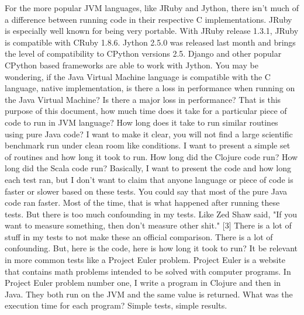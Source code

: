   For the more popular JVM languages, like JRuby and Jython, there isn't much of
  a difference between running code in their respective C implementations. JRuby
  is especially well known for being very portable. With JRuby release 1.3.1,
  JRuby is compatible with CRuby 1.8.6. Jython 2.5.0 was released last month and
  brings the level of compatibility to CPython versions 2.5. Django and other
  popular CPython based frameworks are able to work with Jython. You may be
  wondering, if the Java Virtual Machine language is compatible with the C
  language, native implementation, is there a loss in performance when running
  on the Java Virtual Machine? Is there a major loss in performance? That is
  this purpose of this document, how much time does it take for a particular
  piece of code to run in JVM language? How long does it take to run similar
  routines using pure Java code? I want to make it clear, you will not find a
  large scientific benchmark run under clean room like conditions. I want to
  present a simple set of routines and how long it took to run. How long did the
  Clojure code run? How long did the Scala code run? Basically, I want to
  present the code and how long each test ran, but I don't want to claim that
  anyone language or piece of code is faster or slower based on these tests. You
  could say that most of the pure Java code ran faster. Most of the time, that
  is what happened after running these tests. But there is too much confounding
  in my tests. Like Zed Shaw said, "If you want to measure something, then don't
  measure other shit." [3] There is a lot of stuff in my tests to not make these
  an official comparison. There is a lot of confounding. But, here is the code,
  here is how long it took to run? It be relevant in more common tests like a
  Project Euler problem. Project Euler is a website that contains math problems
  intended to be solved with computer programs. In Project Euler problem number
  one, I write a program in Clojure and then in Java. They both run on the JVM
  and the same value is returned. What was the execution time for each program?
  Simple tests, simple results.

